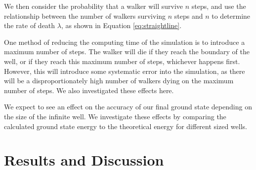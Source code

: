 \documentclass[journal]{IEEEtran}
\begin{document}
We then consider the probability that a walker will survive $n$ steps, and use
the relationship between the number of walkers surviving $n$ steps and $n$ to
determine the rate of death $\lambda$, as shown in Equation \ref{eq:straightline}.

One method of reducing the computing time of the simulation is to introduce a
maximum number of steps. The walker will die if they reach the boundary of the
well, or if they reach this maximum number of steps, whichever happens
first. However, this will introduce some systematic error into the simulation,
as there will be a disproportionately high number of walkers dying on the
maximum number of steps. We also investigated these effects here.

We expect to see an effect on the accuracy of our final ground state depending
on the size of the infinite well. We investigate these effects by comparing the
calculated ground state energy to the theoretical energy for different sized wells.


\section{Results and Discussion}
\end{document}
